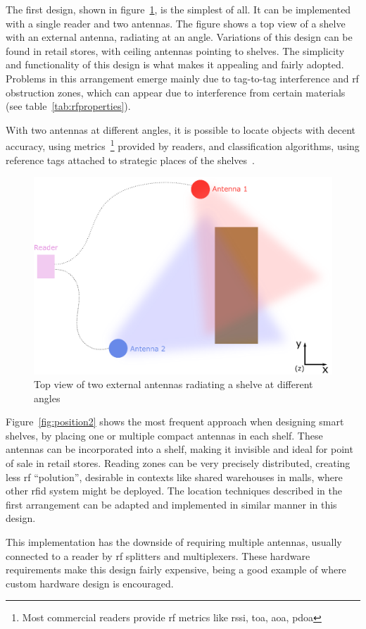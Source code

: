 The first design, shown in figure~\ref{fig:position1}, is the simplest of all. It can be implemented with a single reader and two antennas. The figure shows a top view of a shelve with an external antenna, radiating at an angle. Variations of this design can be found in retail stores, with ceiling antennas pointing to shelves.
The simplicity and functionality of this design is what makes it appealing and fairly adopted.
Problems in this arrangement emerge mainly due to tag-to-tag interference and \ac{rf} obstruction zones, which can appear due to interference from certain materials (see table~\ref{tab:rfproperties}).

With two antennas at different angles, it is possible to locate objects with decent accuracy, using metrics~\footnote{Most commercial readers provide \ac{rf} metrics like \ac{rssi}, \ac{toa}, \ac{aoa}, \ac{pdoa}} provided by readers, and classification algorithms, using reference tags attached to strategic places of the shelves~\cite{dalessandroRFIDBasedSmartShelving2012}.

\begin{figure}[H]
    \centering
    \includegraphics[width=0.6\linewidth]{./figs/02-state-of-the-art/position1.eps}
    \caption{Top view of two external antennas radiating a shelve at different angles}
    \label{fig:position1}
\end{figure}

Figure~\ref{fig:position2} shows the most frequent approach when designing smart shelves, by placing one or multiple compact antennas in each shelf.
These antennas can be incorporated into a shelf, making it invisible and ideal for point of sale in retail stores.
Reading zones can be very precisely distributed, creating less \ac{rf} ``polution'', desirable in contexts like shared warehouses in malls, where other \ac{rfid} system might be deployed.
The location techniques described in the first arrangement can be adapted and implemented in similar manner in this design.

This implementation has the downside of requiring multiple antennas, usually connected to a reader by \ac{rf} splitters and multiplexers.
These hardware requirements make this design fairly expensive, being a good example of where custom hardware design is encouraged.

